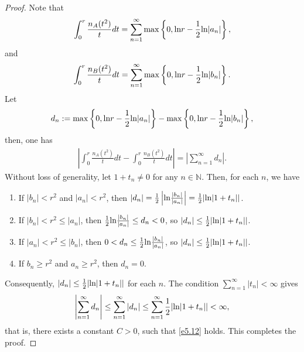 \documentclass[reqno,12pt,centertags]{amsart}
\renewcommand{\ln}{\text{\rm ln}}
\numberwithin{equation}{section}
\theoremstyle{definition}
\begin{document}
\begin{proof}
Note that 
\begin{equation*}
\int_0^r \frac{n_A(t^2)}{t}dt
=\sum_{n=1}^{\infty}\max \left\{0,\ln r-\frac{1}{2}\ln|a_n|\right\}, 
\end{equation*}
and 
\begin{equation*}
\int_0^r \frac{n_B(t^2)}{t}dt
=\sum_{n=1}^{\infty}\max\left\{0,\ln r-\frac{1}{2}\ln|b_n|\right\}.
\end{equation*}
Let
\begin{align*}
d_n:=\max\left\{0,\ln r-\frac{1}{2}\ln|a_n|\right\}
-\max\left\{0,\ln r-\frac{1}{2} \ln|b_n|\right\},
\end{align*}
then, one has 
\begin{align*}
\left|\int_0^r \frac{n_A(t^2)}{t}dt
-\int_0^r \frac{n_B(t^2)}{t}dt\right|
=\left|\sum_{n=1}^{\infty}d_n\right| .
\end{align*}
Without loss of generality, let $1+t_n\neq0$ for any $n\in\mathbb{N}$. Then, for each $n$, we have
\begin{enumerate}
  \item [\textbullet]If $|b_n|<r^2$ and $|a_n|<r^2$, then $|d_n|=\frac{1}{2}\left|\ln\frac{|b_n|}{|a_n|}\right|=\frac{1}{2}|\ln|1+t_n||$.
  \item [\textbullet]If $|b_n|<r^2\leq|a_n|$, then $\frac{1}{2}\ln\frac{|b_n|}{|a_n|}\leq d_n<0$, so $|d_n|\leq \frac{1}{2}|\ln| 1+t_n||$.
  \item [\textbullet]If $|a_n|<r^2\leq|b_n|$, then $0<d_n\leq \frac{1}{2} \ln\frac{|b_n|}{|a_n|}$, so $|d_n|\leq\frac{1}{2}|\ln|1+t_n||$.
  \item [\textbullet]If $b_n \geq r^2$ and $a_n \geq r^2$, then $d_n=0$. 
\end{enumerate}
Consequently,
$|d_n|\leq\frac{1}{2}|\ln|1+t_n||$ for each $n$.
The condition $\sum\limits_{n=1}^{\infty}\left|t_n\right|<\infty$ gives 
\begin{align*}
\left|\sum_{n=1}^{\infty} d_n\right| 
\leq \sum_{n=1}^{\infty}|d_n| 
\leq \sum_{n=1}^{\infty}\frac{1}{2}|\ln|1+t_n||<\infty,
\end{align*}
that is, there exists a  constant $C>0$, such that \eqref{e5.12} holds. This completes the proof.
\end{proof}
\end{document}
